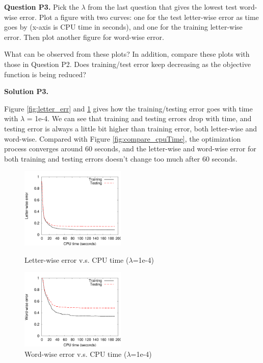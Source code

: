 \documentclass[11pt]{report}
\begin{document}
{\bf Question P3.}
Pick the $\lambda$ from the last question that gives the lowest test word-wise error.
Plot a figure with two curves:
one for the test letter-wise error as time goes by (x-axis is CPU time in seconds),
and one for the training letter-wise error.
Then plot another figure for word-wise error.

What can be observed from these plots?
In addition, compare these plots with those in Question P2.
Does training/test error keep decreasing as the objective function is being reduced?

{\bf Solution P3.}

Figure \ref{fig:letter_err} and \ref{fig:word_err} gives how the training/testing error goes with time with $\lambda$ = {\sf 1e-4}. We can see that training and testing errors drop with time, and testing error is always a little bit higher than training error, both letter-wise and word-wise. Compared with Figure \ref{fig:compare_cpuTime}, the optimization process converges around 60 seconds, and the letter-wise and word-wise error for both training and testing errors doesn't change too much after 60 seconds.

\begin{figure}[htbp!]
\centering
\begin{minipage}[t]{0.49\textwidth}
\centering
\includegraphics[width=5cm]{p3_letter_err.pdf}
\caption{Letter-wise error v.s. CPU time ($\lambda$=1e-4)}
\label{fig:letter_err}
\end{minipage}
%
\begin{minipage}[t]{0.49\textwidth}
\centering
\includegraphics[width=5cm]{p3_word_err.pdf}
\caption{Word-wise error v.s. CPU time ($\lambda$=1e-4)}
\label{fig:word_err}
\end{minipage}
\end{figure}
\end{document}
